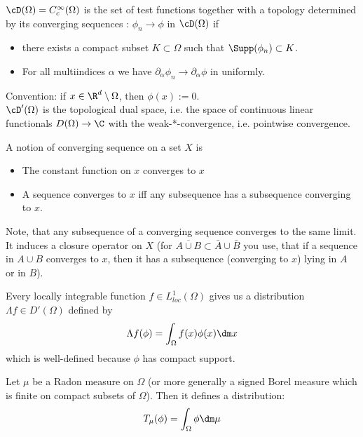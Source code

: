 \begin{definition}
	$\cD(\Omega) = C_c^\infty(\Omega)$ is the set of test functions together with a topology determined by its converging sequences : $\phi_n \to \phi$ in $\cD(\Omega)$ if
	\begin{itemize}
		\item there exists a compact subset $K \subset \Omega$ such that $\Supp(\phi_n) \subset K$.
		\item For all multiindices $\alpha$ we have $\partial_\alpha \phi_n \to \partial_\alpha \phi$ in uniformly.
	\end{itemize}
	Convention: if $x \in \R^d \setminus \Omega$, then $\phi(x) := 0$.\\
	$\cD'(\Omega)$ is the topological dual space, i.e. the space of continuous linear functionals $D(\Omega) \to \C$ with the weak-*-convergence, i.e. pointwise convergence.
\end{definition}
\begin{remark}
	A notion of converging sequence on a set $X$ is
	\begin{itemize}
		\item The constant function on $x$ converges to $x$
		\item A sequence converges to $x$ iff any subsequence has a subsequence converging to $x$.
	\end{itemize}
	Note, that any subsequence of a converging sequence converges to the same limit.
	It induces a closure operator on $X$ (for $\overline{A \cup B} \subset \bar A \cup \bar B$ you use, that if a sequence in $A \cup B$ converges to $x$, then it has a subsequence (converging to $x$) lying in $A$ or in $B$).
\end{remark}
\begin{example}
	Every locally integrable function $f \in L^1_{loc}(\Omega)$ gives us a distribution $\Lambda f \in D'(\Omega)$ defined by
	\[
	\Lambda f (\phi) = \int_{\Omega} f(x) \phi(x) \dm x
	\]
	which is well-defined because $\phi$ has compact support.
\end{example}
\begin{example}
	Let $\mu$ be a Radon measure on $\Omega$ (or more generally a signed Borel measure which is finite on compact subsets of $\Omega$). Then it defines a distribution:
	\[
	T_\mu(\phi) = \int_{\Omega} \phi \dm \mu
	\]
\end{example}
